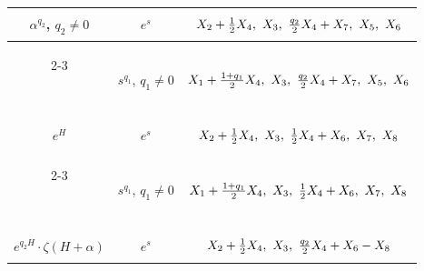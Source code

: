 \begin{center}
\begin{tabular}{|c|c|c|}


%














%














%


$\alpha^{q_2}$, $q_2\ne0$ & $e^s$ & $\myrule X_2+


\frac12 X_4,\ X_3,\ \frac{q_2}{2}X_4+X_7,\ X_5,\ X_6$ \\


\cline{2-3}


\ & $s^{q_1}$, $q_1\ne0$ & $\myrule X_1+\frac{1+q_1}{2}X_4,


\ X_3,\ \frac{q_2}{2}X_4+X_7,\ X_5,\ X_6$ \\


\hline


%


$e^H$ & $e^s$ & $\myrule X_2+\frac12 X_4,\ X_3,


\ \frac12 X_4+X_6,\ X_7,\ X_8$ \\


\cline{2-3}


\ & $s^{q_1}$, $q_1\ne0$ & $\myrule X_1+\frac{1+q_1}{2}X_4,


\ X_3,\ \frac12 X_4+X_6,\ X_7,\ X_8$ \\


\hline


%


$e^{q_2H}\cdot\zeta(H+\alpha)$ & $e^s$ & $\myrule


X_2+\frac12 X_4,\ X_3,\ \frac{q_2}{2}X_4+X_6-X_8$\\



\end{tabular}
\end{center}
